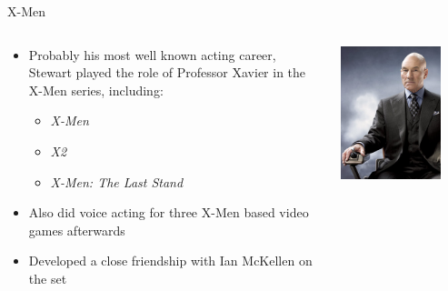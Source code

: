\documentclass[xcolor=dvipsnames]{beamer}
\begin{document}
\begin{frame}{X-Men}
  \begin{columns}
    \begin{column}{0.7\textwidth}
      \begin{itemize}
        \item Probably his most well known acting career, Stewart played the role of Professor
        Xavier in the X-Men series, including:
        \begin{itemize}
          \item{\emph{X-Men}}
          \item{\emph{X2}}
          \item{\emph{X-Men: The Last Stand}}
        \end{itemize}
        \item Also did voice acting for three X-Men based video games afterwards
        \item Developed a close friendship with Ian McKellen on the set
      \end{itemize}
    \end{column}
    \begin{column}{0.3\textwidth}
      \includegraphics[width=0.8\textwidth]{xavier.jpg}
    \end{column}
  \end{columns}

\end{frame}
\end{document}
